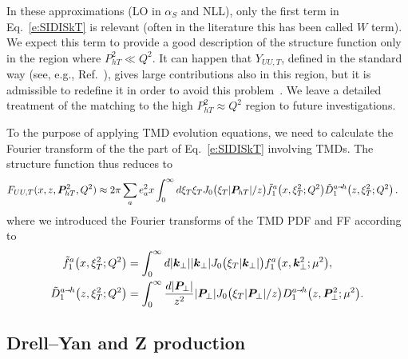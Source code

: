 \documentclass[aps,preprintnumbers,showpacs,nofootinbib,superscriptaddress,floatfix]{revtex4}
\newcommand{\smarrow}{\mbox{\raisebox{-4.5pt}[0pt][0pt]{$\hspace{-1pt} 
		\vec{\phantom{v}}$}}}
\newcommand{\T}{\perp}
\newcommand{\Tperp}{T}
\newcommand{\bT}{\xi_T}
\begin{document}
In these approximations (LO in $\alpha_S$ and NLL), only the first term in
Eq.~\eqref{e:SIDISkT} is relevant (often in the
literature this has been called $W$ term). We expect this term to provide a
good description of the
structure function only in the region where $P_{hT}^2 \ll Q^2$. 
It can happen that $Y_{UU,T}$, defined
in the standard way (see, e.g., Ref.~\cite{Collins:1984kg}), gives large
contributions also in this region, but it is admissible to
redefine it in order to avoid this problem~\cite{Collins:2016hqq}. 
We leave a detailed treatment of the matching to the high $P_{hT}^2 \approx Q^2$
region to future investigations.   

To the purpose of applying TMD evolution equations, we
 need to calculate the Fourier transform of the the part of 
Eq.~\eqref{e:SIDISkT} involving TMDs. The structure function thus reduces to 
\begin{align}
\label{e:SIDISkTFF}
   F_{UU,T}(x,z, \bm{P}_{h \Tperp}^2, Q^2) &\approx 2\pi \sum_a e_a^2 x 
       \int_0^{\infty} {d \bT} \bT J_0\big(\bT |\bm{P}_{hT}|/z\big)
      \tilde{f}_1^a\big(x, \bT^2;Q^2\big) \tilde{D}_1^{a\smarrow h}\big(z, \bT^2;
      Q^2 \big) 
\nonumber \, .
\end{align} 
where we introduced the Fourier transforms of the TMD PDF and FF according to
\begin{align} 
\tilde{f}_1^a\big(x, \bT^2;Q^2\big) &=
\int_0^{\infty} d |\bm{k}_\T| 
                |\bm{k}_\T|J_0\big(\bT |\bm{k}_\T|\big) 
       f_1^a\big(x, \bm{k}_\T^2;\mu^2\big),
\\
\tilde{D}_1^{a\smarrow h}\big(z, \bT^2; Q^2 \big) &=
\int_0^{\infty} \frac{d |\bm{P}_{\T}|}{z^2} |\bm{P}_{\T}| 
                                             J_0\big(\bT |\bm{P}_{\T}|/z\big)
       D_1^{a\smarrow h}\big(z, \bm{P}_{\T}^2; \mu^2 \big).
\end{align}  


\subsection{Drell--Yan and Z production}
\label{ss:DY_formalism}
\end{document}
